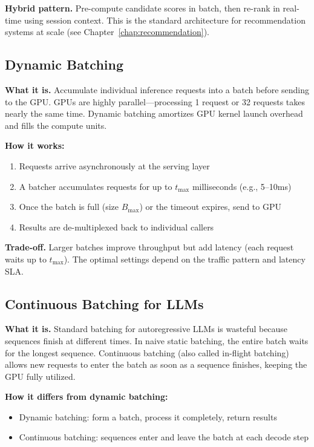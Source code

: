 \textbf{Hybrid pattern.} Pre-compute candidate scores in batch, then re-rank in real-time using session context. This is the standard architecture for recommendation systems at scale (see Chapter~\ref{chap:recommendation}).

\subsection{Dynamic Batching}

\textbf{What it is.} Accumulate individual inference requests into a batch before sending to the GPU. GPUs are highly parallel---processing 1 request or 32 requests takes nearly the same time. Dynamic batching amortizes GPU kernel launch overhead and fills the compute units.

\textbf{How it works:}
\begin{enumerate}
    \item Requests arrive asynchronously at the serving layer
    \item A batcher accumulates requests for up to $t_{\text{max}}$ milliseconds (e.g., 5--10ms)
    \item Once the batch is full (size $B_{\max}$) or the timeout expires, send to GPU
    \item Results are de-multiplexed back to individual callers
\end{enumerate}

\textbf{Trade-off.} Larger batches improve throughput but add latency (each request waits up to $t_{\text{max}}$). The optimal settings depend on the traffic pattern and latency SLA.

\subsection{Continuous Batching for LLMs}

\textbf{What it is.} Standard batching for autoregressive LLMs is wasteful because sequences finish at different times. In naive static batching, the entire batch waits for the longest sequence. Continuous batching (also called in-flight batching) allows new requests to enter the batch as soon as a sequence finishes, keeping the GPU fully utilized.

\textbf{How it differs from dynamic batching:}
\begin{itemize}
    \item Dynamic batching: form a batch, process it completely, return results
    \item Continuous batching: sequences enter and leave the batch at each decode step
\end{itemize}

